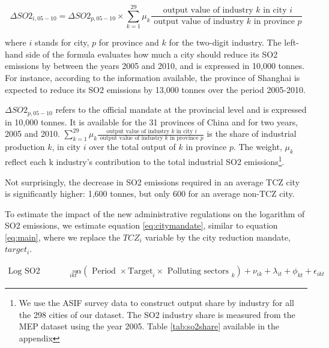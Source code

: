 \documentclass[12pt]{article}
\begin{document}
\begin{equation} \label{eq:mandate}
\Delta SO2_{i, 05 − 10}=\Delta SO2_{p, 05 − 10} \times \sum_{k=1}^{29} \mu_{k} \frac{\text { output value of industry } k \text { in city } i}{\text { output value of industry } k \text { in province } p}
\end{equation}

where $i$ stands for city, $p$ for province and $k$ for the two-digit industry. The left-hand side of the formula evaluates how much a city should reduce its SO2 emissions by between the years 2005 and 2010, and is expressed in 10,000 tonnes. For instance, according to the information available, the province of Shanghai is expected to reduce its SO2 emissions by 13,000 tonnes over the period 2005-2010.

$\Delta SO2_{p, 05 − 10}$ refers to the official mandate at the provincial level and is expressed in 10,000 tonnes. It is available for the 31 provinces of China and for two years, 2005 and 2010. $\sum_{k=1}^{29} \mu_{k} \frac{\text { output value of industry } k \text { in city } i}{\text { output value of industry } k \text { in province } p}$ is the share of industrial production $k$, in city $i$ over the total output of $k$ in province $p$. The weight, $\mu_{k}$ reflect each k industry's contribution to the total industrial SO2 emissions\footnote{We use the ASIF survey data to construct output share by industry for all the 298 cities of our dataset. The SO2 industry share is measured from the MEP dataset using the year 2005. Table \ref{tab:so2share} available in the appendix}. 

Not surprisingly, the decrease in SO2 emissions required in an average TCZ city is significantly higher: 1,600 tonnes, but only 600 for an average non-TCZ city. 

To estimate the impact of the new administrative regulations on the logarithm of SO2 emissions, we estimate equation \ref{eq:citymandate}, similar to equation \ref{eq:main}, where we replace the $TCZ_i$ variable by the city reduction mandate, $target_i$. 

\begin{equation} \label{eq:citymandate}
\begin{aligned} 
\text {Log SO2 emission }_{i k t}=& \alpha  (\text { Period }  \times \text{Target}_i \times \text {  Polluting sectors }_{k}) +\nu_{ik}+\lambda_{it} +\phi_{kt} +\epsilon_{ikt}  
\end{aligned}
\end{equation}
\end{document}
